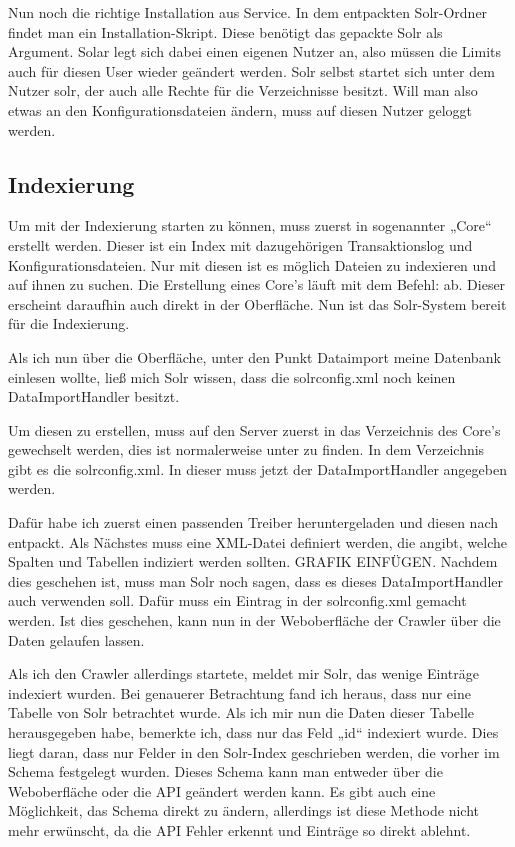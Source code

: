 Nun noch die richtige Installation aus Service. In dem entpackten Solr-Ordner findet man ein Installation-Skript. Diese benötigt das gepackte Solr als Argument. Solar legt sich dabei einen eigenen Nutzer an, also müssen die Limits auch für diesen User wieder geändert werden. Solr selbst startet sich unter dem Nutzer solr, der auch alle Rechte für die Verzeichnisse besitzt. Will man also etwas an den Konfigurationsdateien ändern, muss auf diesen Nutzer geloggt werden.

\subsection{Indexierung}

Um mit der Indexierung starten zu können, muss zuerst in sogenannter „Core“ erstellt werden. Dieser ist ein Index mit dazugehörigen Transaktionslog und Konfigurationsdateien. Nur mit diesen ist es möglich Dateien zu indexieren und auf ihnen zu suchen.
Die Erstellung eines Core’s läuft mit dem Befehl:  ab. Dieser erscheint daraufhin auch direkt in der Oberfläche. Nun ist das Solr-System bereit für die Indexierung.

Als ich nun über die Oberfläche, unter den Punkt Dataimport meine Datenbank einlesen wollte, ließ mich Solr wissen, dass die solrconfig.xml noch keinen DataImportHandler besitzt.

Um diesen zu erstellen, muss auf den Server zuerst in das Verzeichnis des Core’s gewechselt werden, dies ist normalerweise unter  zu finden. In dem Verzeichnis gibt es die solrconfig.xml. In dieser muss jetzt der DataImportHandler angegeben werden. \cite{solrref.2019b}

Dafür habe ich zuerst einen passenden Treiber heruntergeladen und diesen nach  entpackt. Als Nächstes muss eine XML-Datei definiert werden, die angibt, welche Spalten und Tabellen indiziert werden sollten. {GRAFIK EINFÜGEN}. Nachdem dies geschehen ist, muss man Solr noch sagen, dass es dieses DataImportHandler auch verwenden soll. Dafür muss ein Eintrag in der solrconfig.xml gemacht werden. Ist dies geschehen, kann nun in der Weboberfläche der Crawler über die Daten gelaufen lassen. \cite{IqubalMustafaKaki.2016}

Als ich den Crawler allerdings startete, meldet mir Solr, das wenige Einträge indexiert wurden. Bei genauerer Betrachtung fand ich heraus, dass nur eine Tabelle von Solr betrachtet wurde. Als ich mir nun die Daten dieser Tabelle herausgegeben habe, bemerkte ich, dass nur das Feld „id“ indexiert wurde. Dies liegt daran, dass nur Felder in den Solr-Index geschrieben werden, die vorher im Schema festgelegt wurden. Dieses Schema kann man entweder über die Weboberfläche oder die API geändert werden kann. Es gibt auch eine Möglichkeit, das Schema direkt zu ändern, allerdings ist diese Methode nicht mehr erwünscht, da die API Fehler erkennt und Einträge so direkt ablehnt.


